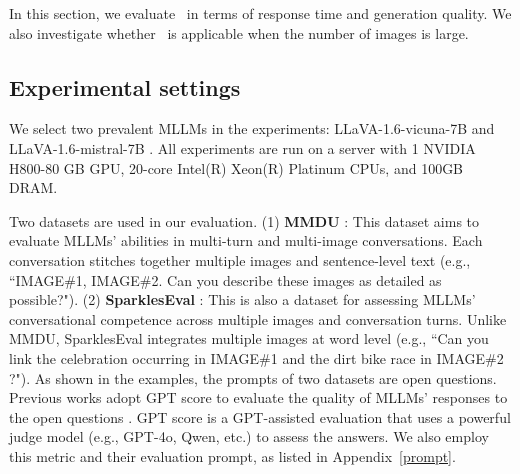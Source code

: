 
In this section, we evaluate \sys~in terms of response time and generation quality. We also investigate whether \sys~is applicable when the number of images is large.
\subsection{Experimental settings}
We select two prevalent MLLMs in the experiments: LLaVA-1.6-vicuna-7B and LLaVA-1.6-mistral-7B \cite{liu2024llavanext}. All experiments are run on a server with 1 NVIDIA H800-80 GB GPU, 20-core Intel(R) Xeon(R) Platinum CPUs, and 100GB DRAM.

Two datasets are used in our evaluation. (1) \textbf{MMDU} \cite{liu2024mmdu}: This dataset aims to evaluate MLLMs' abilities in multi-turn and multi-image conversations. Each conversation stitches together multiple images and sentence-level text (e.g., ``IMAGE\#1, IMAGE\#2. Can you describe these images as detailed as possible?"). (2) \textbf{SparklesEval} \cite{huang2024sparkles}: This is also a dataset for assessing MLLMs' conversational competence across multiple images and conversation turns. Unlike MMDU, SparklesEval integrates multiple images at word level (e.g., ``Can you link the celebration occurring in IMAGE\#1 and the dirt bike race in IMAGE\#2 ?"). As shown in the examples, the prompts of two datasets are open questions. Previous works adopt GPT score to evaluate the quality of MLLMs' responses to the open questions \cite{liu2024mmdu, huang2024sparkles}. GPT score is a GPT-assisted evaluation that uses a powerful judge model (e.g., GPT-4o, Qwen, etc.) to assess the answers. We also employ this metric and their evaluation prompt, as listed in Appendix~\ref{prompt}.


